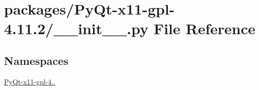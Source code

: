 \hypertarget{packages_2PyQt-x11-gpl-4_811_82_2____init_____8py}{}\section{packages/\+Py\+Qt-\/x11-\/gpl-\/4.11.2/\+\_\+\+\_\+init\+\_\+\+\_\+.py File Reference}
\label{packages_2PyQt-x11-gpl-4_811_82_2____init_____8py}
\subsection*{Namespaces}
\begin{DoxyCompactItemize}
\item 
 \hyperlink{namespacePyQt-x11-gpl-4_811_82}{Py\+Qt-\/x11-\/gpl-\/4..}
\end{DoxyCompactItemize}
